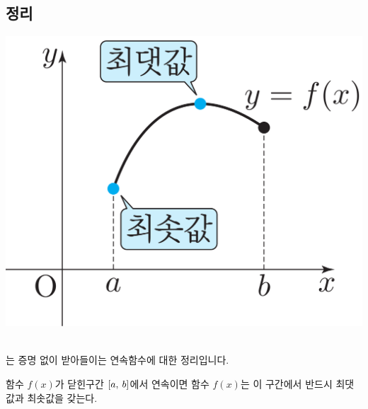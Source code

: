 \subsection{\Mmi{} 정리}
\begin{center}
\includegraphics[scale=\pgfkeysvalueof{picsize}]{DBs/pic/zerg_04.pdf}\
\end{center}는 증명 없이 받아들이는 연속함수에 대한 정리입니다.
\begin{thmbox}
    함수 $f\left( x \right) $가 닫힌구간 $\left[a,\: b\right]$에서 연속이면 함수 $f\left( x \right) $는 이 구간에서 반드시 최댓값과 최솟값을 갖는다. 
\end{thmbox}
